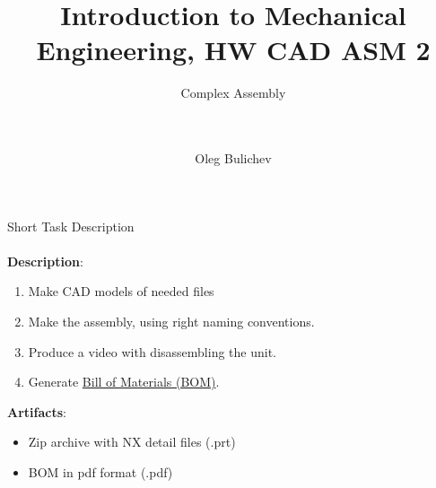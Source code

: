 \documentclass[aspectratio=169]{beamer}
\title[IME]{Introduction to Mechanical Engineering, HW CAD ASM 2} %
\subtitle{Complex Assembly
\\ \  \\ \ 
         } %
\author{Oleg Bulichev}
\newcommand{\fbckg}[1]{\usebackgroundtemplate{\texttt{[image: \#1]}}}%
\begin{document}
\setlength{\abovedisplayskip}{0pt}
\setlength{\belowdisplayskip}{0pt}
\setlength{\abovedisplayshortskip}{0pt}
\setlength{\belowdisplayshortskip}{0pt}

\fbckg{fibeamer/figs/title_page.png}

\fbckg{fibeamer/figs/common.png}

\note{\scriptsize \begin{itemize}
        \item \
    \end{itemize}}

\note{
   \ 
}

\begin{frame}[t]{Short Task Description}
    \framesubtitle{}
    \textbf{Description}:
    \begin{enumerate}
        \item Make CAD models of needed files
        \item Make the assembly, using right naming conventions.
        \item Produce a video with disassembling the unit.
        \item Generate \href{https://en.wikipedia.org/wiki/Bill_of_materials}{Bill of Materials (BOM)}.
    \end{enumerate}

    \textbf{Artifacts}: 
    \begin{itemize}
        \item Zip archive with NX detail files (.prt)
        \item BOM in pdf format (.pdf)
    \end{itemize}
\end{frame}
\end{document}
